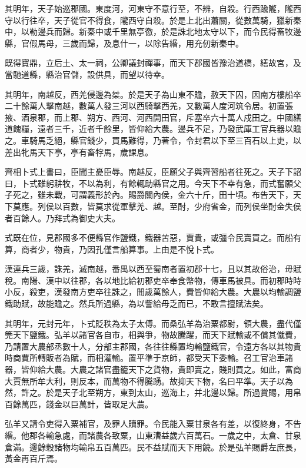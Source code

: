 其明年，天子始巡郡國。東度河，河東守不意行至，不辨，自殺。行西踰隴，隴西守以行往卒，天子從官不得食，隴西守自殺。於是上北出蕭關，從數萬騎，獵新秦中，以勒邊兵而歸。新秦中或千里無亭徼，於是誅北地太守以下，而令民得畜牧邊縣，官假馬母，三歲而歸，及息什一，以除告緡，用充仞新秦中。

既得寶鼎，立后土、太一祠，公卿議封禪事，而天下郡國皆豫治道橋，繕故宮，及當馳道縣，縣治官儲，設供具，而望以待幸。

其明年，南越反，西羌侵邊為桀。於是天子為山東不贍，赦天下囚，因南方樓船卒二十餘萬人擊南越，數萬人發三河以西騎擊西羌，又數萬人度河筑令居。初置張掖、酒泉郡，而上郡、朔方、西河、河西開田官，斥塞卒六十萬人戍田之。中國繕道餽糧，遠者三千，近者千餘里，皆仰給大農。邊兵不足，乃發武庫工官兵器以贍之。車騎馬乏絕，縣官錢少，買馬難得，乃著令，令封君以下至三百石以上吏，以差出牝馬天下亭，亭有畜牸馬，歲課息。

齊相卜式上書曰，臣聞主憂臣辱。南越反，臣願父子與齊習船者往死之。天子下詔曰，卜式雖躬耕牧，不以為利，有餘輒助縣官之用。今天下不幸有急，而式奮願父子死之，雖未戰，可謂義形於內。賜爵關內侯，金六十斤，田十頃。布告天下，天下莫應。列侯以百數，皆莫求從軍擊羌、越。至酎，少府省金，而列侯坐酎金失侯者百餘人。乃拜式為御史大夫。

式既在位，見郡國多不便縣官作鹽鐵，鐵器苦惡，賈貴，或彊令民賣買之。而船有算，商者少，物貴，乃因孔僅言船算事。上由是不悅卜式。

漢連兵三歲，誅羌，滅南越，番禺以西至蜀南者置初郡十七，且以其故俗治，毋賦稅。南陽、漢中以往郡，各以地比給初郡吏卒奉食幣物，傳車馬被具。而初郡時時小反，殺吏，漢發南方吏卒往誅之，閒歲萬餘人，費皆仰給大農。大農以均輸調鹽鐵助賦，故能贍之。然兵所過縣，為以訾給毋乏而已，不敢言擅賦法矣。

其明年，元封元年，卜式貶秩為太子太傅。而桑弘羊為治粟都尉，領大農，盡代僅筦天下鹽鐵。弘羊以諸官各自市，相與爭，物故騰躍，而天下賦輸或不償其僦費，乃請置大農部丞數十人，分部主郡國，各往往縣置均輸鹽鐵官，令遠方各以其物貴時商賈所轉販者為賦，而相灌輸。置平準于京師，都受天下委輸。召工官治車諸器，皆仰給大農。大農之諸官盡籠天下之貨物，貴即賣之，賤則買之。如此，富商大賈無所牟大利，則反本，而萬物不得騰踴。故抑天下物，名曰平準。天子以為然，許之。於是天子北至朔方，東到太山，巡海上，并北邊以歸。所過賞賜，用帛百餘萬匹，錢金以巨萬計，皆取足大農。

弘羊又請令吏得入粟補官，及罪人贖罪。令民能入粟甘泉各有差，以復終身，不告緡。他郡各輸急處，而諸農各致粟，山東漕益歲六百萬石。一歲之中，太倉、甘泉倉滿。邊餘穀諸物均輸帛五百萬匹。民不益賦而天下用饒。於是弘羊賜爵左庶長，黃金再百斤焉。

